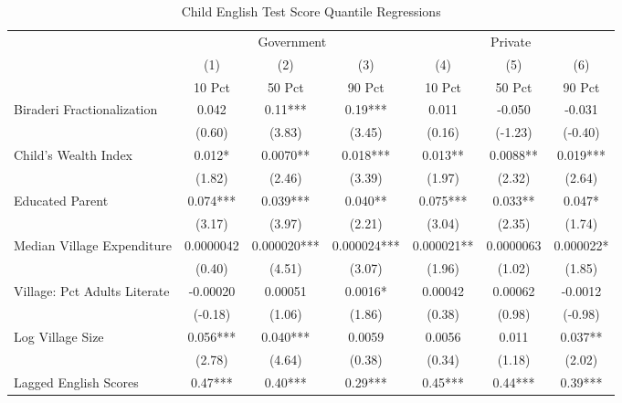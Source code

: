\begin{sidewaystable}[htbp]\centering
\def\sym#1{\ifmmode^{#1}\else\(^{#1}\)\fi}
\caption{Child English Test Score Quantile Regressions\label{kidsquantsenglish}}
\begin{tabular}{l*{6}{c}}
\toprule
                &\multicolumn{3}{c}{Government}        &\multicolumn{3}{c}{Private}           \\\cmidrule(lr){2-4}\cmidrule(lr){5-7}
                &\multicolumn{1}{c}{(1)}&\multicolumn{1}{c}{(2)}&\multicolumn{1}{c}{(3)}&\multicolumn{1}{c}{(4)}&\multicolumn{1}{c}{(5)}&\multicolumn{1}{c}{(6)}\\
                &\multicolumn{1}{c}{10 Pct}&\multicolumn{1}{c}{50 Pct}&\multicolumn{1}{c}{90 Pct}&\multicolumn{1}{c}{10 Pct}&\multicolumn{1}{c}{50 Pct}&\multicolumn{1}{c}{90 Pct}\\
\midrule
Biraderi Fractionalization&    0.042   &     0.11***&     0.19***&    0.011   &   -0.050   &   -0.031   \\
                &   (0.60)   &   (3.83)   &   (3.45)   &   (0.16)   &  (-1.23)   &  (-0.40)   \\
Child's Wealth Index&    0.012*  &   0.0070** &    0.018***&    0.013** &   0.0088** &    0.019***\\
                &   (1.82)   &   (2.46)   &   (3.39)   &   (1.97)   &   (2.32)   &   (2.64)   \\
Educated Parent &    0.074***&    0.039***&    0.040** &    0.075***&    0.033** &    0.047*  \\
                &   (3.17)   &   (3.97)   &   (2.21)   &   (3.04)   &   (2.35)   &   (1.74)   \\
Median Village Expenditure&0.0000042   & 0.000020***& 0.000024***& 0.000021** &0.0000063   & 0.000022*  \\
                &   (0.40)   &   (4.51)   &   (3.07)   &   (1.96)   &   (1.02)   &   (1.85)   \\
Village: Pct Adults Literate& -0.00020   &  0.00051   &   0.0016*  &  0.00042   &  0.00062   &  -0.0012   \\
                &  (-0.18)   &   (1.06)   &   (1.86)   &   (0.38)   &   (0.98)   &  (-0.98)   \\
Log Village Size&    0.056***&    0.040***&   0.0059   &   0.0056   &    0.011   &    0.037** \\
                &   (2.78)   &   (4.64)   &   (0.38)   &   (0.34)   &   (1.18)   &   (2.02)   \\
Lagged English Scores&     0.47***&     0.40***&     0.29***&     0.45***&     0.44***&     0.39***\\

\end{tabular}
\end{sidewaystable}
